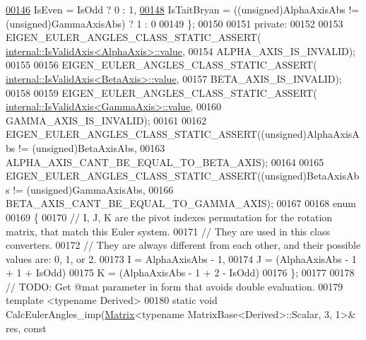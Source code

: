 \begin{DoxyCode}
\hyperlink{class_eigen_1_1_euler_system_ab1604e0e8eb9b72fa937236fdb9fd68da7d962970ece2524efb5aa4317d89c17c}{00146}       IsEven = IsOdd ? 0 : 1, 
\hyperlink{class_eigen_1_1_euler_system_ab1604e0e8eb9b72fa937236fdb9fd68dae4c717ae02bcec9247f5ef7d2d5d91fa}{00148}       IsTaitBryan = ((unsigned)AlphaAxisAbs != (\textcolor{keywordtype}{unsigned})GammaAxisAbs) ? 1 : 0 
00149     \};
00150     
00151     \textcolor{keyword}{private}:
00152     
00153     EIGEN\_EULER\_ANGLES\_CLASS\_STATIC\_ASSERT(
      \hyperlink{struct_eigen_1_1internal_1_1_is_valid_axis}{internal::IsValidAxis<AlphaAxis>::value},
00154       ALPHA\_AXIS\_IS\_INVALID);
00155       
00156     EIGEN\_EULER\_ANGLES\_CLASS\_STATIC\_ASSERT(
      \hyperlink{struct_eigen_1_1internal_1_1_is_valid_axis}{internal::IsValidAxis<BetaAxis>::value},
00157       BETA\_AXIS\_IS\_INVALID);
00158       
00159     EIGEN\_EULER\_ANGLES\_CLASS\_STATIC\_ASSERT(
      \hyperlink{struct_eigen_1_1internal_1_1_is_valid_axis}{internal::IsValidAxis<GammaAxis>::value},
00160       GAMMA\_AXIS\_IS\_INVALID);
00161       
00162     EIGEN\_EULER\_ANGLES\_CLASS\_STATIC\_ASSERT((\textcolor{keywordtype}{unsigned})AlphaAxisAbs != (\textcolor{keywordtype}{unsigned})BetaAxisAbs,
00163       ALPHA\_AXIS\_CANT\_BE\_EQUAL\_TO\_BETA\_AXIS);
00164       
00165     EIGEN\_EULER\_ANGLES\_CLASS\_STATIC\_ASSERT((\textcolor{keywordtype}{unsigned})BetaAxisAbs != (\textcolor{keywordtype}{unsigned})GammaAxisAbs,
00166       BETA\_AXIS\_CANT\_BE\_EQUAL\_TO\_GAMMA\_AXIS);
00167 
00168     \textcolor{keyword}{enum}
00169     \{
00170       \textcolor{comment}{// I, J, K are the pivot indexes permutation for the rotation matrix, that match this Euler system. }
00171       \textcolor{comment}{// They are used in this class converters.}
00172       \textcolor{comment}{// They are always different from each other, and their possible values are: 0, 1, or 2.}
00173       I = AlphaAxisAbs - 1,
00174       J = (AlphaAxisAbs - 1 + 1 + IsOdd)%
00175       K = (AlphaAxisAbs - 1 + 2 - IsOdd)%
00176     \};
00177     
00178     \textcolor{comment}{// TODO: Get @mat parameter in form that avoids double evaluation.}
00179     \textcolor{keyword}{template} <\textcolor{keyword}{typename} Derived>
00180     \textcolor{keyword}{static} \textcolor{keywordtype}{void} CalcEulerAngles\_imp(\hyperlink{group___core___module_class_eigen_1_1_matrix}{Matrix}<\textcolor{keyword}{typename} MatrixBase<Derived>::Scalar, 3, 1>& res, \textcolor{keyword}{const} 

\end{DoxyCode}
